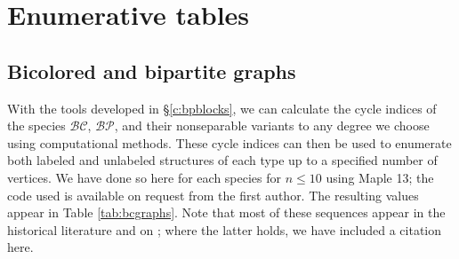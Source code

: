 \documentclass[sectionflow,singlespace,twoside,boldmathhdr,draft]{brandiss} %
\numberwithin{section}{chapter}
\numberwithin{figure}{chapter}
\begin{document}
\chapter{Enumerative tables}\label{c:enum}
\section{Bicolored and bipartite graphs}\label{s:bpenum}
With the tools developed in \S \ref{c:bpblocks}, we can calculate the cycle indices of the species $\mathcal{BC}$, $\mathcal{BP}$, and their nonseparable variants to any degree we choose using computational methods.
These cycle indices can then be used to enumerate both labeled and unlabeled structures of each type up to a specified number of vertices.
We have done so here for each species for $n \leq 10$ using Maple 13; the code used is available on request from the first author.
The resulting values appear in Table \ref{tab:bcgraphs}.
Note that most of these sequences appear in the historical literature and on \cite{oeis}; where the latter holds, we have included a citation here.
\end{document}
